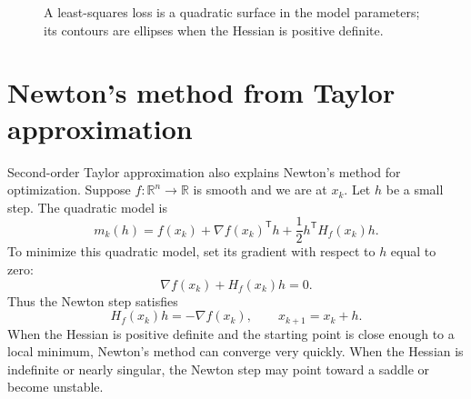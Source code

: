 \documentclass[11pt]{article}
\newcommand{\R}{\mathbb R}
\newcommand{\grad}{\nabla}
\newcommand{\T}{^{\mathsf T}}
\begin{document}
\begin{figure}[H]
\centering
{}
\caption{A least-squares loss is a quadratic surface in the model parameters; its contours are ellipses when the Hessian is positive definite.}
\end{figure}

\section{Newton's method from Taylor approximation}

Second-order Taylor approximation also explains Newton's method for optimization. Suppose $f:\R^n\to\R$ is smooth and we are at $x_k$. Let $h$ be a small step. The quadratic model is
\[
m_k(h)=f(x_k)+\grad f(x_k)\T h+\frac12h\T H_f(x_k)h.
\]
To minimize this quadratic model, set its gradient with respect to $h$ equal to zero:
\[
\grad f(x_k)+H_f(x_k)h=0.
\]
Thus the Newton step satisfies
\[
H_f(x_k)h=-\grad f(x_k),
\qquad
x_{k+1}=x_k+h.
\]
When the Hessian is positive definite and the starting point is close enough to a local minimum, Newton's method can converge very quickly. When the Hessian is indefinite or nearly singular, the Newton step may point toward a saddle or become unstable.
\end{document}
